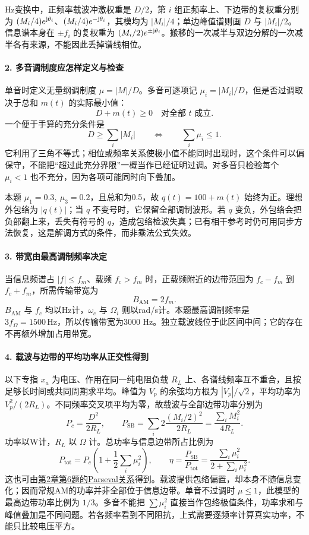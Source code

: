 Hz变换中，正频率载波冲激权重是 $D/2$，第 $i$ 组正频率上、下边带的复权重分别为 $(M_i/4)e^{\mathrm{j}\theta_i}$、$(M_i/4)e^{-\mathrm{j}\theta_i}$，其模均为 $|M_i|/4$；单边峰值谱则画 $D$ 与 $|M_i|/2$。信息谱本身在 $\pm f_i$ 的复权重为 $(M_i/2)e^{\pm\mathrm{j}\theta_i}$。搬移的一次减半与双边分解的一次减半各有来源，不能因此丢掉谱线相位。

\paragraph{2. 多音调制度应怎样定义与检查}
单音时定义无量纲调制度 $\mu=|M|/D$。多音可逐项记 $\mu_i=|M_i|/D$，但是否过调取决于总和 $m(t)$ 的实际最小值：
\[
\boxed{D+m(t)\geq0\quad\text{对全部 }t\text{ 成立}}.
\]
一个便于手算的充分条件是
\[
D\geq\sum_i|M_i|\qquad\Longleftrightarrow\qquad
\sum_i\mu_i\leq1.
\]
它利用了三角不等式；相位或频率关系使极小值不能同时出现时，这个条件可以偏保守，不能把“超过此充分界限”一概当作已经证明过调。对多音只检验每个 $\mu_i<1$ 也不充分，因为各项可能同时向下叠加。

本题 $\mu_1=0.3,\ \mu_3=0.2$，且总和为0.5，故 $q(t)=100+m(t)$ 始终为正。理想外包络为 $|q(t)|$；当 $q$ 不变号时，它保留全部调制波形。若 $q$ 变负，外包络会把负部翻上来，丢失有符号的 $q$，造成包络检波失真；已有相干参考时仍可用同步方法恢复，这是解调方式的条件，而非乘法公式失效。

\paragraph{3. 带宽由最高调制频率决定}
当信息频谱占 $|f|\leq f_m$、载频 $f_c>f_m$ 时，正载频附近的边带范围为 $f_c-f_m$ 到 $f_c+f_m$，所需传输带宽为
\[
\boxed{B_{\mathrm{AM}}=2f_m}.
\]
$B_{\mathrm{AM}}$ 与 $f_c$ 均以Hz计，$\omega_c$ 与 $\Omega_i$ 则以rad/s计。本题最高调制频率是 $3f_\Omega=1500\,\mathrm{Hz}$，所以传输带宽为3000 Hz。独立载波线位于此区间中间；它的存在不再额外增加占用带宽。

\paragraph{4. 载波与边带的平均功率从正交性得到}
以下专指 $x_a$ 为电压、作用在同一纯电阻负载 $R_L$ 上、各谱线频率互不重合，且按足够长时间或共同周期求平均。峰值为 $V_p$ 的余弦均方根为 $|V_p|/\sqrt2$，平均功率为 $V_p^2/(2R_L)$。不同频率交叉项平均为零，故载波与全部边带功率分别为
\[
P_c=\frac{D^2}{2R_L},\qquad
P_{\mathrm{SB}}=\sum_i2\frac{(M_i/2)^2}{2R_L}
=\frac{\sum_iM_i^2}{4R_L}.
\]
功率以W计，$R_L$ 以 $\Omega$ 计。总功率与信息边带所占比例为
\[
P_{\mathrm{tot}}=P_c\left(1+\frac12\sum_i\mu_i^2\right),
\qquad
\eta=\frac{P_{\mathrm{SB}}}{P_{\mathrm{tot}}}
=\frac{\sum_i\mu_i^2}{2+\sum_i\mu_i^2}.
\]
这也可由\hyperref[kn:2-6]{第2章第6题的Parseval关系}得到。载波提供包络偏置，却本身不随信息变化；因而常规AM的功率并非全部位于信息边带。单音不过调时 $\mu\leq1$，此模型的最高边带功率比例为 $1/3$。多音不能把 $\sum\mu_i^2$ 直接当作包络极值条件，功率求和与峰值叠加是不同问题。若各频率看到不同阻抗，上式需要逐频率计算真实功率，不能只比较电压平方。

